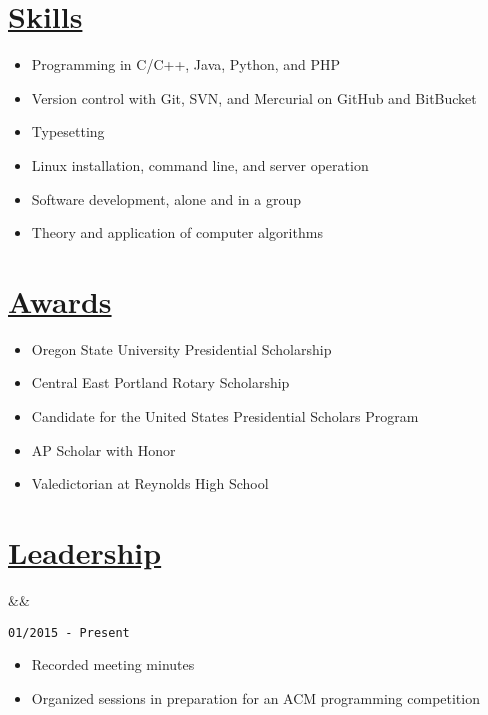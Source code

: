 \documentclass[11pt]{article}
\newcommand{\heading}[1]{
    \section*{\uline{\hfill #1}}
}
\newcommand{\squish}{
    \setlength{\itemsep}{0pt}
    \setlength{\parskip}{0pt}
    \setlength{\parsep}{0pt}
}
\newcommand{\when}[1]{
    \hfill \texttt{#1}%
}
\newcommand{\experience}[3]{
    \ifx&#2&
        \item[{#1}]
    \else
        \item[{#1}, \emph{#2}]
    \fi
    \when{#3}%
}
\begin{document}
\heading{Skills}%

\begin{itemize} [leftmargin=1.35cm]\squish
	\item Programming in C/C++, Java, Python, and PHP
	\item Version control with Git, SVN, and Mercurial on GitHub and BitBucket
	\item Typesetting 
	\item Linux installation, command line, and server operation
	\item Software development, alone and in a group
	\item Theory and application of computer algorithms
\end{itemize}

\heading{Awards}%
\begin{itemize}[leftmargin=1.35cm]\squish
	\item Oregon State University Presidential Scholarship
	\item Central East Portland Rotary Scholarship
	\item Candidate for the United States Presidential Scholars Program
	\item AP Scholar with Honor
	\item Valedictorian at Reynolds High School
\end{itemize}
\heading{Leadership}%

\begin{description}
\squish
\experience{Oregon State University ACM Student Chapter -- Secretary}
	{}
	{01/2015 - Present}%
	\vspace*{-4pt}
	\begin{itemize} [leftmargin=*]\squish
		\item Recorded meeting minutes
		\item Organized sessions in preparation for an ACM programming competition
	\end{itemize}
	
\end{description}
\end{document}
